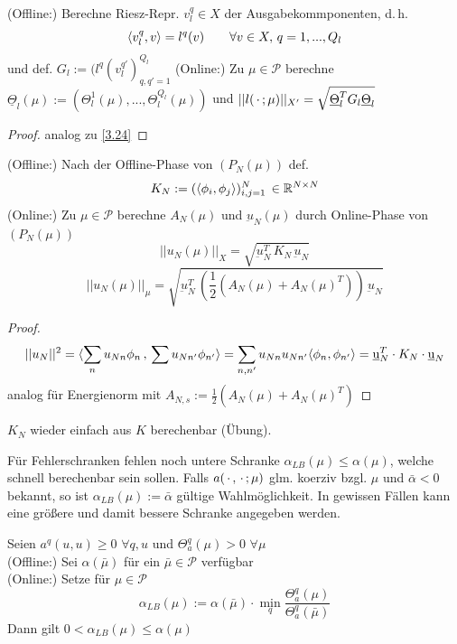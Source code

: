 \begin{kor}
	(Offline:) Berechne Riesz-Repr. $v_l^q \in X$ der Ausgabekommponenten, d.\,h.
	\[
		\langle v_l^q, v \rangle = l^q(v) \qquad \forall v \in X, \, q=1,...,Q_l
	\]
	und def. $G_l := (l^q(v_l^{q'})_{q, q' =1}^{Q_l}$
	(Online:) Zu $\mu \in \mathcal{P}$ berechne $\underline{\Theta}_l (\mu) := (\Theta_l^1(\mu),...,\Theta_l^{Q_l}(\mu))$ und $||l(\,\cdot\,;\mu)||_{X'} = \sqrt{\underline{\Theta}_l^T G_l \underline{\Theta}_l}$
\end{kor}

\begin{proof}
	analog zu \ref{3.24}
\end{proof}

\begin{kor}
	(Offline:) Nach der Offline-Phase von $(P_N(\mu))$ def.
	\[
		K_N := (\dotp{\phi_i}{\phi_j})_{i,j=1}^N \, \in \R^{N \times N}
	\]
	(Online:) Zu $\mu \in \mathcal{P}$ berechne $A_N(\mu)$ und $\underbar u_N(\mu)$ durch Online-Phase von $(P_N(\mu))$
	\[
		|| u_N(\mu)||_X = \sqrt{\underbar u_N^T \, K_N \, \underbar u_N}
	\]
	\[
		|| u_N(\mu)||_{\mu} = \sqrt{\underbar u_N^T \, (\frac{1}{2} (A_N(\mu) + A_N(\mu)^T)) \, \underbar u_N}
	\]
\end{kor}

\begin{proof}
	\begin{align*}
		||u_N||^2 = \dotp{\sum_n u_{Nn} \phi_n \, }{ \, \sum u_{Nn'} \phi_{n'}} = \sum_{n, n'} u_{Nn} u_{Nn'} \dotp{\phi_n}{\phi_{n'}} = \underbar u_N^T \cdot K_N \cdot \underbar u_N
	\end{align*}	
	analog für Energienorm mit $A_{N,s} := \frac{1}{2} (A_N(\mu) + A_N(\mu)^T)$
\end{proof}

\begin{bem}
	$K_N$ wieder einfach aus $K$ berechenbar (Übung).
\end{bem}

Für Fehlerschranken fehlen noch untere Schranke $\alpha_{LB} (\mu) \le \alpha (\mu)$, welche schnell berechenbar sein sollen.
Falls $a(\,\cdot\, , \,\cdot\, ; \mu)$ glm. koerziv bzgl. $\mu$ und $\bar{\alpha} < 0$ bekannt, so ist $\alpha_{LB} (\mu) := \bar{\alpha}$ gültige Wahlmöglichkeit.
In gewissen Fällen kann eine größere und damit bessere Schranke angegeben werden.

\begin{satz} \label{3.27}
	Seien $a^q(u,u) \geq 0 \,\, \forall q,u$ und $\Theta_a^q (\mu) > 0 \,\, \forall \mu$ \\
	(Offline:) Sei $\alpha(\bar{\mu})$ für ein $\bar{\mu} \in \mathcal{P}$ verfügbar \\
	(Online:) Setze für $\mu \in \mathcal{P}$
	\[
		\alpha_{LB} (\mu) := \alpha(\bar{\mu}) \cdot \min_{q} \frac{\Theta_a^q(\mu)}{\Theta_a^q(\bar{\mu})}
	\]
	Dann gilt $0 < \alpha_{LB} (\mu) \leq \alpha(\mu)$
\end{satz}

